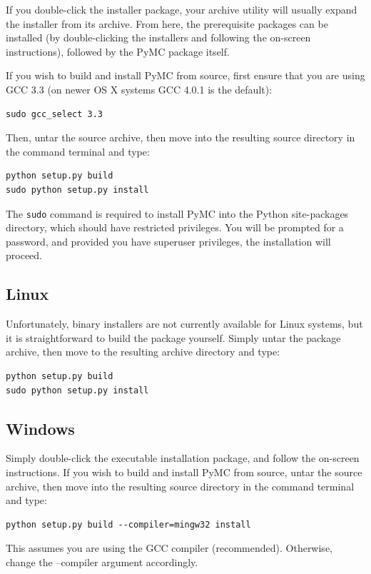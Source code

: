 \documentclass[]{book}
\begin{document}
If you double-click the installer package, your archive utility will usually expand the installer from its archive. From here, the prerequisite packages can be installed (by double-clicking the installers and following the on-screen instructions), followed by the PyMC package itself. 

If you wish to build and install PyMC from source, first ensure that you are using GCC 3.3 (on newer OS X systems GCC 4.0.1 is the default):
\begin{verbatim}
sudo gcc_select 3.3
\end{verbatim}
Then, untar the source archive, then move into the resulting source directory in the command terminal and type:
\begin{verbatim}
python setup.py build 
sudo python setup.py install
\end{verbatim}
The \verb=sudo= command is required to install PyMC into the Python site-packages directory, which should have restricted privileges. You will be prompted for a password, and provided you have superuser privileges, the installation will proceed.

\subsection{Linux}

Unfortunately, binary installers are not currently available for Linux systems, but it is straightforward to build the package yourself. Simply untar the package archive, then move to the resulting archive directory and type:
\begin{verbatim}
python setup.py build 
sudo python setup.py install
\end{verbatim}

\subsection{Windows}

Simply double-click the executable installation package, and follow the on-screen instructions.
If you wish to build and install PyMC from source, untar the source archive, then move into the resulting source directory in the command terminal and type:
\begin{verbatim}
python setup.py build --compiler=mingw32 install
\end{verbatim}
This assumes you are using the GCC compiler (recommended). Otherwise, change the --compiler argument accordingly.
\end{document}
